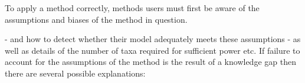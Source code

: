 \documentclass[a4paper,12pt]{article}
\renewcommand{\subsection}[1]{%
\bigskip
\begin{center}
\begin{large}
\normalfont\itshape #1
\end{large}
\end{center}}
\begin{document}






\subsection{}

To apply a method correctly, methods users must first be aware of the assumptions and biases of the method in question.  


- and how to detect whether their model adequately meets these assumptions - as well as details of the number of taxa required for sufficient power etc. If failure to account for the assumptions of the method is the result of a knowledge gap then there are several possible explanations:
\end{document}
